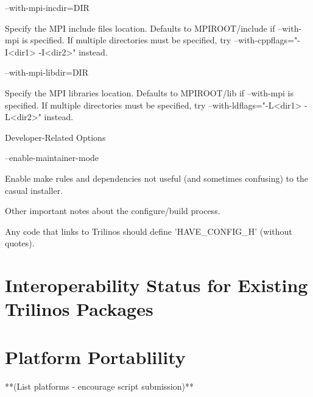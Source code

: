\documentclass[12pt,relax]{TrilinosDevGuide}
\begin{document}
\bullet --with-mpi-incdir=DIR

Specify the MPI include files location. Defaults to MPIROOT/include if 
--with-mpi is specified. If multiple directories  must be specified, try 
--with-cppflags="-I<dir1> -I<dir2>" instead.

\bullet --with-mpi-libdir=DIR 

Specify the MPI libraries location. Defaults to MPIROOT/lib if --with-mpi 
is specified. If multiple directories must be specified, try 
--with-ldflags="-L<dir1> -L<dir2>" instead. 

   Developer-Related Options

\bullet --enable-maintainer-mode 

Enable make rules and dependencies not useful (and sometimes confusing) to 
the casual installer.

\triangleright Other important notes about the configure/build process.

\circ Any code that links to Trilinos should define 'HAVE_CONFIG_H' (without
quotes).

	\chapter{Interoperability Status for Existing Trilinos Packages}

	\chapter{Platform Portablility}
	**(List platforms - encourage script submission)**
    \clearpage
    
    

\end{document}
